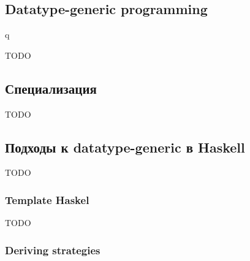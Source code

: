 

\subsection{Datatype-generic programming}

q\cite{maguire-types, backhousedatatype, chapman2010gentle}




TODO %

\subsection{Специализация}







TODO %

\subsection{Подходы к datatype-generic в Haskell}

TODO %

\subsubsection{Template Haskel}





TODO %

\subsubsection{Deriving strategies}

